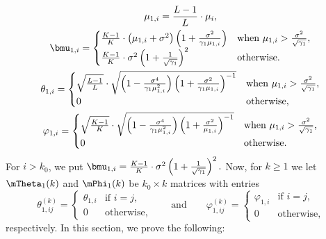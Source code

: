 \begin{subequations}
\begin{gather}
	\mu_{1,i}
		= 
			\frac{L-1}{L} \cdot \mu_{i}, \\
	\bmu_{1,i}
		=
		\begin{cases}
			\frac{K-1}{K}
			\cdot
            \left( \mu_{1,i} + \sigma^2 \right)
            \left( 1 + \frac{\sigma^2}{\gamma_1 \mu_{1,i}} \right)
                &\text{when $\mu_{1,i} 
							 > 
							 \frac{\sigma^2}{\sqrt{\gamma_1}}$}, \\
			\frac{K-1}{K}
			\cdot
            \sigma^2 \left( 1 + \frac{1}{\sqrt{\gamma_1}} \right)^2
                &\text{otherwise.}
        \end{cases}		
			\\
	\theta_{1,i}
		=
	        \begin{cases}
				\sqrt{\frac{L-1}{L}}
				\cdot
				\sqrt{
		            \left( 
						1 
						- 
						\frac{\sigma^4}{ \gamma_1 \mu_{1,i}^2}
					\right)
		            \left(
						1 
						+ 
						\frac{\sigma^2}{ \gamma_1 \mu_{1,i} } 
					\right)^{-1}
				}
	            &\text{when $\mu_{1,i} 
							 > 
							 \frac{\sigma^2}{\sqrt{\gamma_1}}$,} \\
	            0
	            &\text{otherwise,}
	        \end{cases} \\
    \varphi_{1,i}
        =
            \begin{cases}
				\sqrt{\frac{K-1}{K}}
				\cdot
				\sqrt{
	                \left( 
						1 
						- 
						\frac{\sigma^4}{ \gamma_1 \mu_{1,i}^2} 
					\right)
	                \left(
						1 
						+ 
						\frac{\sigma^2}{ \mu_{1,i} } 
					\right)^{-1}
				}
                &\text{when $\mu_{1,i} 
							 > 
							\frac{\sigma^2}{\sqrt{\gamma_1}}$,} \\
                0
                &\text{otherwise.}
            \end{cases}
\end{gather}
\end{subequations}
For $i > k_0$, we put 
\(
    \bmu_{1,i} 
        =
            \frac{K-1}{K} 
            \cdot
            \sigma^2
            \left(
                1
                +
                \frac{1}{\sqrt{\gamma_1}}
            \right)^2.
\)
Now, for $k \geq 1$ we let $\mTheta_{1}(k)$ and $\mPhi_1(k)$ be $k_0 \times k$ matrices with entries
\begin{equation}
    \theta_{1,ij}^{(k)}
        =
            \begin{cases}
                \theta_{1,i}&\text{if $i = j$,} \\
                0&\text{otherwise,}
            \end{cases}
    \qquad
    \text{and}
    \qquad
    \varphi_{1,ij}^{(k)}
        =
            \begin{cases}
                \varphi_{1,i}&\text{if $i = j$,} \\
                0&\text{otherwise,}
            \end{cases}
\end{equation}
respectively.  In this section, we prove the following:

